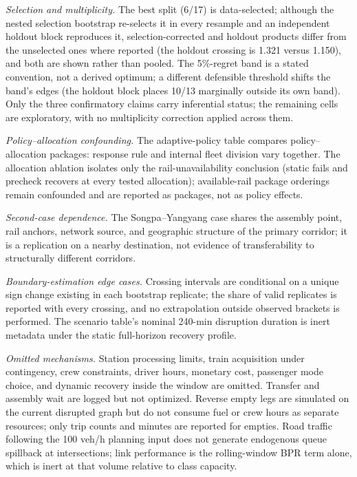 \documentclass{ieeeaccess}
\begin{document}
\emph{Selection and multiplicity.} The best split (6/17) is data-selected; although the nested selection bootstrap re-selects it in every resample and an independent holdout block reproduces it, selection-corrected and holdout products differ from the unselected ones where reported (the holdout crossing is 1.321 versus 1.150), and both are shown rather than pooled. The 5\%-regret band is a stated convention, not a derived optimum; a different defensible threshold shifts the band's edges (the holdout block places 10/13 marginally outside its own band). Only the three confirmatory claims carry inferential status; the remaining cells are exploratory, with no multiplicity correction applied across them.

\emph{Policy--allocation confounding.} The adaptive-policy table compares policy--allocation packages: response rule and internal fleet division vary together. The allocation ablation isolates only the rail-unavailability conclusion (static fails and precheck recovers at every tested allocation); available-rail package orderings remain confounded and are reported as packages, not as policy effects.

\emph{Second-case dependence.} The Songpa--Yangyang case shares the assembly point, rail anchors, network source, and geographic structure of the primary corridor; it is a replication on a nearby destination, not evidence of transferability to structurally different corridors.

\emph{Boundary-estimation edge cases.} Crossing intervals are conditional on a unique sign change existing in each bootstrap replicate; the share of valid replicates is reported with every crossing, and no extrapolation outside observed brackets is performed. The scenario table's nominal 240-min disruption duration is inert metadata under the static full-horizon recovery profile.

\emph{Omitted mechanisms.} Station processing limits, train acquisition under contingency, crew constraints, driver hours, monetary cost, passenger mode choice, and dynamic recovery inside the window are omitted. Transfer and assembly wait are logged but not optimized. Reverse empty legs are simulated on the current disrupted graph but do not consume fuel or crew hours as separate resources; only trip counts and minutes are reported for empties. Road traffic following the 100 veh/h planning input does not generate endogenous queue spillback at intersections; link performance is the rolling-window BPR term alone, which is inert at that volume relative to class capacity.
\end{document}
